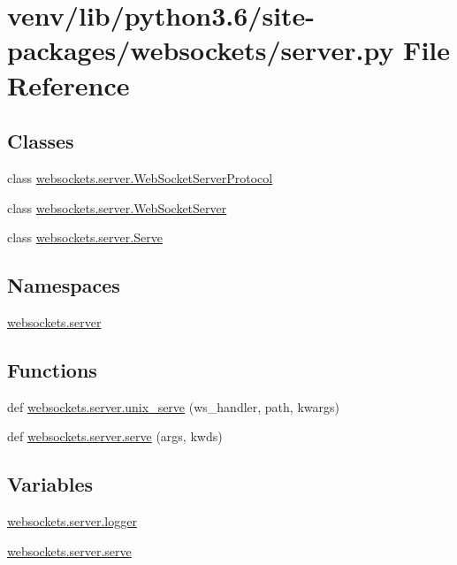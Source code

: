 \hypertarget{venv_2lib_2python3_86_2site-packages_2websockets_2server_8py}{}\section{venv/lib/python3.6/site-\/packages/websockets/server.py File Reference}
\label{venv_2lib_2python3_86_2site-packages_2websockets_2server_8py}
\subsection*{Classes}
\begin{DoxyCompactItemize}
\item 
class \hyperlink{classwebsockets_1_1server_1_1_web_socket_server_protocol}{websockets.\+server.\+Web\+Socket\+Server\+Protocol}
\item 
class \hyperlink{classwebsockets_1_1server_1_1_web_socket_server}{websockets.\+server.\+Web\+Socket\+Server}
\item 
class \hyperlink{classwebsockets_1_1server_1_1_serve}{websockets.\+server.\+Serve}
\end{DoxyCompactItemize}
\subsection*{Namespaces}
\begin{DoxyCompactItemize}
\item 
 \hyperlink{namespacewebsockets_1_1server}{websockets.\+server}
\end{DoxyCompactItemize}
\subsection*{Functions}
\begin{DoxyCompactItemize}
\item 
def \hyperlink{namespacewebsockets_1_1server_a87c4bd8b9d6a51924dcb6acdad9db174}{websockets.\+server.\+unix\+\_\+serve} (ws\+\_\+handler, path, kwargs)
\item 
def \hyperlink{namespacewebsockets_1_1server_a8798ba30b4746584755b6f9e40da7beb}{websockets.\+server.\+serve} (args, kwds)
\end{DoxyCompactItemize}
\subsection*{Variables}
\begin{DoxyCompactItemize}
\item 
\hyperlink{namespacewebsockets_1_1server_a8da2b6864f11c2d32b3e67f529653a43}{websockets.\+server.\+logger}
\item 
\hyperlink{namespacewebsockets_1_1server_a48e58e13634c5531b6308499865aa45c}{websockets.\+server.\+serve}
\end{DoxyCompactItemize}
